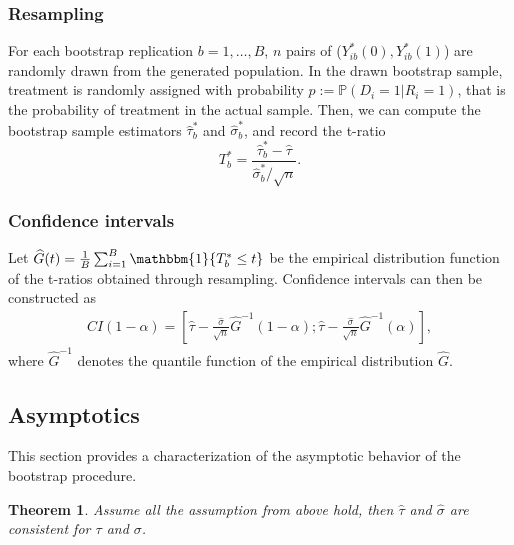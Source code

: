 \documentclass[aodsor,preprint]{imsart}
\numberwithin{equation}{section}
\theoremstyle{plain}
\newtheorem{thm}{Theorem}[section]
\newcommand{\ind}{\mathbbm{1}} %
\begin{document}
\subsubsection{Resampling}

For each bootstrap replication $b = 1,\ldots, B$, $n$ pairs of ($Y_{ib}^*(0), Y_{ib}^*(1)$) are randomly drawn from the generated population. In the drawn bootstrap sample, treatment is randomly assigned with probability $p:= \mathbb{P}(D_i = 1 | R_i = 1)$, that is the probability of treatment in the actual sample. Then, we can compute the bootstrap sample estimators $\widehat{\tau}_b^*$ and $\widehat{\sigma}_b^*$, and record the t-ratio
$$
T_b^* = \frac{\widehat{\tau}_b^* - \widehat{\tau}}{\widehat{\sigma}_b^* / \sqrt{n}}.
$$

\subsubsection{Confidence intervals}

Let $\widehat{G}(t) = \frac{1}{B} \sum_{i=1}^{B} \ind\{T_b^* \leq t\}$ be the empirical distribution function of the t-ratios obtained through resampling. Confidence intervals can then be constructed as 
\begin{align} \label{CI}
	CI(1-\alpha) = \left[ \widehat{\tau} - \frac{\widehat{\sigma}}{\sqrt{n}} \widehat{G}^{-1}(1-\alpha); \widehat{\tau} - \frac{\widehat{\sigma}}{\sqrt{n}} \widehat{G}^{-1}(\alpha)  \right],
\end{align}
where $\widehat{G}^{-1}$ denotes the quantile function of the empirical distribution $\widehat{G}$.

\subsection{Asymptotics}

This section provides a characterization of the asymptotic behavior of the bootstrap procedure.

\begin{thm}
	Assume all the assumption from above hold, then $\widehat{\tau}$ and $\widehat{\sigma}$ are consistent for $\tau$ and $\sigma$.
\end{thm}
\end{document}
